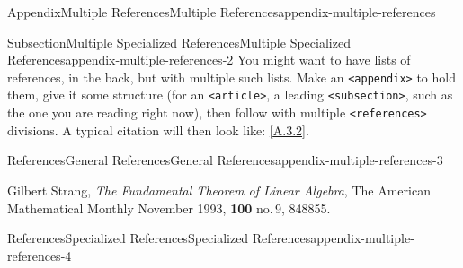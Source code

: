 \documentclass[twoside,10pt,]{article}
\newcommand{\xreffont}{\relax}
\newcommand{\mono}[1]{\texttt{#1}}
\numberwithin{equation}{section}
\begin{document}
%
\appendix%
%
%
%
%
\typeout{************************************************}
\typeout{************************************************}
%
\begin{appendixptx}{Appendix}{Multiple References}{}{Multiple References}{}{}{appendix-multiple-references}
\renewcommand*{\appendixname}{Appendix}
%
%
\typeout{************************************************}
\typeout{************************************************}
%
\begin{subsectionptx}{Subsection}{Multiple Specialized References}{}{Multiple Specialized References}{}{}{appendix-multiple-references-2}
You might want to have lists of references, in the back, but with multiple such lists.  Make an \mono{<appendix>} to hold them, give it some structure (for an \mono{<article>}, a leading \mono{<subsection>}, such as the one you are reading right now), then follow with multiple \mono{<references>} divisions.  A typical citation will then look like: \hyperlink{biblio-strang-article-tres}{[{\xreffont A.3.2}]}.%
\end{subsectionptx}
%
%
\typeout{************************************************}
\typeout{************************************************}
%
\begin{references-subsection}{References}{General References}{}{General References}{}{}{appendix-multiple-references-3}
\begin{referencelist}
\hypertarget{biblio-strang-article-uno}{}Gilbert Strang, \textit{The Fundamental Theorem of Linear Algebra}, The American Mathematical Monthly November 1993, \textbf{100} no.\@\,9, 848\textendash{}855.
\end{referencelist}
\end{references-subsection}
%
%
\typeout{************************************************}
\typeout{************************************************}
%
\begin{references-subsection}{References}{Specialized References}{}{Specialized References}{}{}{appendix-multiple-references-4}

\end{references-subsection}
\end{appendixptx}
\end{document}
